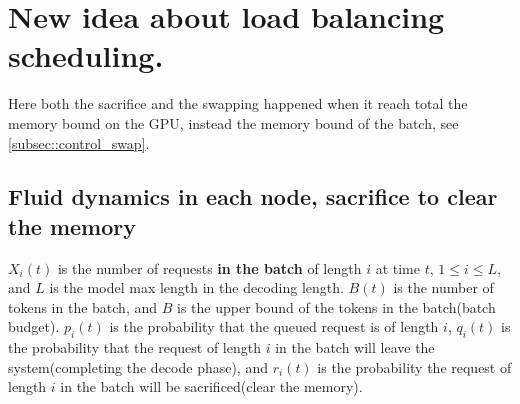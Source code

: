 
\section{New idea about load balancing scheduling.}

Here both the sacrifice and the swapping happened when it reach total the memory bound on the GPU, instead the memory bound of the batch, see \ref{subsec::control_swap}.

\subsection{Fluid dynamics in each node, sacrifice to clear the memory}

$X_i(t)$ is the number of requests \textbf{in the batch} of length $i$ at time $t$, $1\leq i\leq L$, and $L$ is the model max length in the decoding length. $B(t)$ is the number of tokens in the batch, and $B$ is the upper bound of the tokens in the batch(batch budget). $p_i(t)$ is the probability that the queued request is of length $i$, $q_i(t)$ is the probability that the request of length $i$ in the batch will leave the system(completing the decode phase), and $r_i(t)$ is the probability the request of length $i$ in the batch will be sacrificed(clear the memory).

